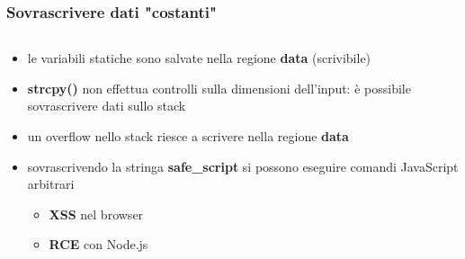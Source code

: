 \documentclass{beamer}
\begin{document}
\begin{frame}
  \frametitle{Sovrascrivere dati "costanti"}
  \begin{columns}
    \begin{column}{0.55\textwidth}
      \begin{itemize}
        \item le variabili statiche sono salvate nella regione \textbf{data}
          (scrivibile)
        \pause
        \item \textbf{strcpy()} non effettua controlli sulla dimensioni dell'input: è possibile sovrascrivere dati sullo stack
        \pause
        \item un overflow nello stack riesce a scrivere nella regione \textbf{data}
        \pause
      \item sovrascrivendo la stringa
        \textbf{safe\_script} si
          possono eseguire comandi JavaScript arbitrari
        \begin{itemize}
          \item \textbf{XSS} nel browser
          \item \textbf{RCE} con Node.js
        \end{itemize}


\end{itemize}
\end{column}
\end{columns}
\end{frame}
\end{document}
